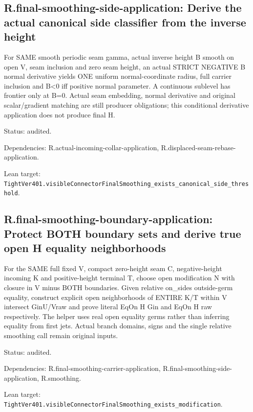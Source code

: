 \documentclass{article}
\begin{document}
\subsection*{R.final-smoothing-side-application: Derive the actual canonical side classifier from the inverse height}
For SAME smooth periodic seam gamma, actual inverse height B smooth on open V, seam inclusion and zero seam height, an actual STRICT NEGATIVE B normal derivative yields ONE uniform normal-coordinate radius, full carrier inclusion and B<0 iff positive normal parameter. A continuous sublevel has frontier only at B=0. Actual seam embedding, normal derivative and original scalar/gradient matching are still producer obligations; this conditional derivative application does not produce final H.
\par Status: audited.
\par Dependencies: R.actual-incoming-collar-application, R.displaced-seam-rebase-application.
\par Lean target: \texttt{TightVer401.visibleConnectorFinalSmoothing\_exists\_canonical\_side\_threshold}.
\subsection*{R.final-smoothing-boundary-application: Protect BOTH boundary sets and derive true open H equality neighborhoods}
For the SAME full fixed V, compact zero-height seam C, negative-height incoming K and positive-height terminal T, choose open modification N with closure in V minus BOTH boundaries. Given relative on\_sides outside-germ equality, construct explicit open neighborhoods of ENTIRE K/T within V intersect GinU/Vraw and prove literal EqOn H Gin and EqOn H raw respectively. The helper uses real open equality germs rather than inferring equality from first jets. Actual branch domains, signs and the single relative smoothing call remain original inputs.
\par Status: audited.
\par Dependencies: R.final-smoothing-carrier-application, R.final-smoothing-side-application, R.smoothing.
\par Lean target: \texttt{TightVer401.visibleConnectorFinalSmoothing\_exists\_modification}.
\end{document}
